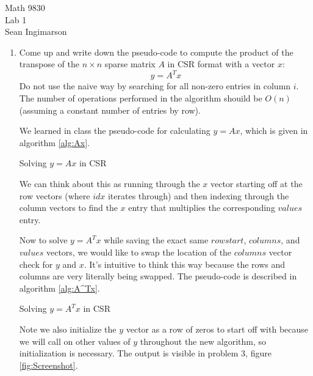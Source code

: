 \documentclass[12pt]{article}
\newcommand{\tsp}{\vspace{3mm}}
\numberwithin{equation}{section}
\begin{document}
\begin{center}
\begin{large}
Math 9830\\
Lab 1\\
Sean Ingimarson
\end{large}
\end{center}

\begin{enumerate}
\item  Come up and write down the pseudo-code to compute the product of the transpose of the $n \times n$ sparse matrix $A$ in CSR format with a vector $x$:
$$y=A^Tx$$
Do not use the naive way by searching for all non-zero entries in column $i$.  The number of operations performed in the algorithm shouild be $O(n)$ (assuming a constant number of entries by row).

\tsp

\begin{tcolorbox}[breakable]

We learned in class the pseudo-code for calculating $y=Ax$, which is given in algorithm \ref{alg:Ax}.

\begin{algorithm}[H]
\caption{Solving $y=Ax$ in CSR}
\label{alg:Ax}
\end{algorithm}

We can think about this as running through the $x$ vector starting off at the row vectors (where $idx$ iterates through) and then indexing through the column vectors to find the $x$ entry that multiplies the corresponding $values$ entry.

Now to solve $y=A^Tx$ while saving the exact same $rowstart$, $columns$, and $values$ vectors, we would like to swap the location of the $columns$ vector check for $y$ and $x$.  It's intuitive to think this way because the rows and columns are very literally being swapped.  The pseudo-code is described in algorithm \ref{alg:A^Tx}.

\begin{algorithm}[H]
\caption{Solving $y=A^Tx$ in CSR}
\label{alg:A^Tx}
\end{algorithm}
Note we also initialize the $y$ vector as a row of zeros to start off with because we will call on other values of $y$ throughout the new algorithm, so initialization is necessary.  The output is visible in problem 3, figure \ref{fig:Screenshot}.
\end{tcolorbox}


\end{enumerate}
\end{document}
